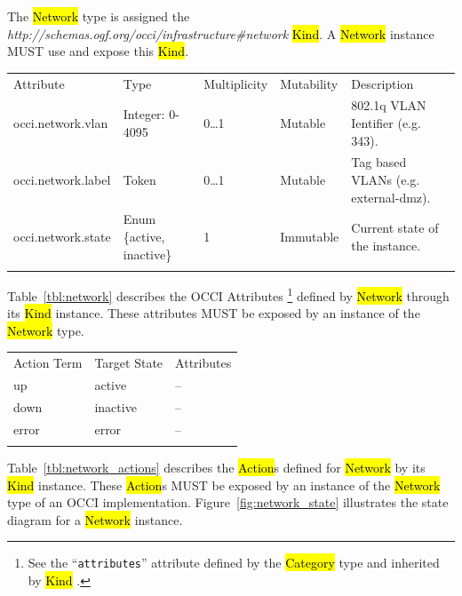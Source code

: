 \documentclass[10pt,a4paper]{article}
\begin{document}
The \hl{Network} type is assigned the
\textit{http://schemas.ogf.org/occi/infrastructure\#network}
\hl{Kind}. A \hl{Network} instance MUST use and expose this \hl{Kind}.

{
	\begin{tabular}{lllll}
	\toprule
	Attribute&Type&Multi\-plicity&Mutability&Description\\
	\colrule
	occi.network.vlan & Integer: 0-4095 & 0\ldots1 & Mutable 
	& 802.1q VLAN Ientifier (e.g. 343).\\
	occi.network.label & Token & 0\ldots1 & Mutable 
	& Tag based VLANs (e.g. external-dmz).\\
	occi.network.state & Enum \{active, inactive\} & 1 & Immutable 
	& Current state of the instance.\\
	\botrule
	\end{tabular}
}

Table~\ref{tbl:network} describes the OCCI Attributes%
\footnote{See the ``{\tt attributes}'' attribute defined by the
  \hl{Category} type and inherited by \hl{Kind} \cite{occi:core}.}
defined by \hl{Network} through its \hl{Kind} instance. These
attributes MUST be exposed by an instance of the \hl{Network} type.

{
	\begin{tabular}{lll}
	\toprule
	Action Term&Target State&Attributes\\
	\colrule
	up & active & --\\
	down & inactive & --\\
	error & error & --\\
	\botrule
	\end{tabular}
}

Table~\ref{tbl:network_actions} describes the \hl{Action}s defined for
\hl{Network} by its \hl{Kind} instance. These \hl{Action}s MUST be
exposed by an instance of the \hl{Network} type of an OCCI
implementation.  Figure~\ref{fig:network_state} illustrates the state
diagram for a \hl{Network} instance.
\end{document}
